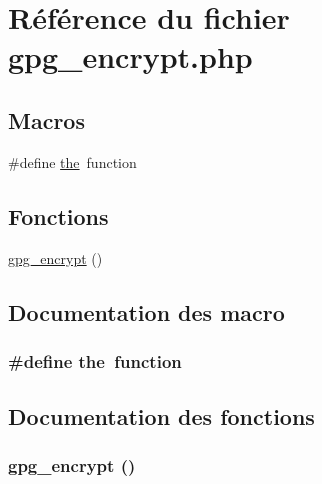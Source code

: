 \hypertarget{gpg__encrypt_8php}{
\section{R\'{e}f\'{e}rence du fichier gpg\_\-encrypt.php}
\label{gpg__encrypt_8php}
}
\subsection*{Macros}
\begin{CompactItemize}
\item 
\#define \hyperlink{gpg__encrypt_8php_a0}{the}\ function
\end{CompactItemize}
\subsection*{Fonctions}
\begin{CompactItemize}
\item 
\hyperlink{gpg__encrypt_8php_a1}{gpg\_\-encrypt} ()
\end{CompactItemize}


\subsection{Documentation des macro}
\hypertarget{gpg__encrypt_8php_a0}{
\subsubsection[the]{\setlength{\rightskip}{0pt plus 5cm}\#define the\ function}}
\label{gpg__encrypt_8php_a0}




\subsection{Documentation des fonctions}
\hypertarget{gpg__encrypt_8php_a1}{
\subsubsection[gpg\_\-encrypt]{\setlength{\rightskip}{0pt plus 5cm}gpg\_\-encrypt ()}}
\label{gpg__encrypt_8php_a1}


